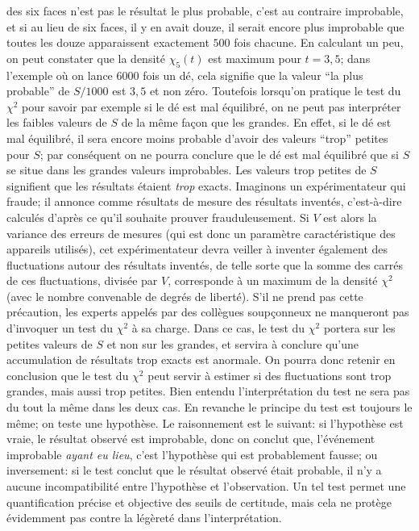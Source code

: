des six faces n'est pas le r\'esultat le plus probable, c'est au contraire
improbable, et si au lieu de six faces, il y en avait douze, il serait
encore plus improbable que toutes les douze apparaissent exactement
$500$ fois chacune. En calculant un peu, on peut constater que la
densit\'e $\chi_5 (t)$ est maximum pour $t = 3,5$; dans l'exemple o\`u 
on lance $6000$ fois un d\'e, cela signifie que la valeur ``la plus
probable'' de $S / 1000$ est $3,5$ et non z\'ero. 
\medskip
Toutefois lorsqu'on pratique le test du $\chi^2$ pour savoir par exemple 
si le d\'e est mal \'equilibr\'e, on ne peut pas interpr\'eter les faibles 
valeurs de $S$ de la m\^eme fa\c{c}on que les grandes. En effet, si le d\'e 
est mal \'equilibr\'e, il sera encore moins probable d'avoir des valeurs
``trop'' petites pour $S$; par cons\'equent on ne pourra conclure que le 
d\'e est mal \'equilibr\'e que si $S$ se situe dans les grandes valeurs
improbables. Les valeurs trop petites de $S$ signifient que les r\'esultats
\'etaient {\it trop} exacts. Imaginons un exp\'erimentateur qui fraude; il
annonce comme r\'esultats de mesure des r\'esultats invent\'es,
c'est-\`a-dire calcul\'es d'apr\`es ce qu'il souhaite prouver
frauduleusement. Si $V$ est alors la variance des erreurs de mesures (qui
est donc un param\`etre caract\'eristique des appareils utilis\'es), cet
exp\'erimentateur devra veiller \`a inventer \'egalement des fluctuations
autour des r\'esultats invent\'es, de telle sorte que la somme des carr\'es
de ces fluctuations, divis\'ee par $V$, corresponde \`a un maximum de la
densit\'e $\chi^2$ (avec le nombre convenable de degr\'es de libert\'e). S'il
ne prend pas cette pr\'ecaution, les experts appel\'es par des coll\`egues
soup\c{c}onneux ne manqueront pas d'invoquer un test du $\chi^2$ \`a sa
charge. Dans ce cas, le test du $\chi^2$ portera sur les petites valeurs de
$S$ et non sur les grandes, et servira \`a conclure qu'une accumulation
de r\'esultats trop exacts est anormale.
\medskip
On pourra donc retenir en conclusion que le test du $\chi^2$ peut servir
\`a estimer si des fluctuations sont trop grandes, mais aussi trop
petites. Bien entendu l'interpr\'etation du test ne sera pas du tout la 
m\^eme dans les deux cas. En revanche le principe du test est toujours 
le m\^eme;  on teste une hypoth\`ese. Le raisonnement est le suivant: si 
l'hypoth\`ese est vraie, le r\'esultat observ\'e est improbable, donc on
conclut que, l'\'ev\'enement improbable {\it ayant eu lieu}, c'est
l'hypoth\`ese qui est probablement fausse; ou inversement: si le test
conclut que le r\'esultat observ\'e \'etait probable, il n'y a aucune
incompatibilit\'e entre l'hypoth\`ese et l'observation. Un tel test permet
une quantification pr\'ecise et objective des seuils de certitude, mais 
cela ne prot\`ege \'evidemment pas contre la l\'eg\`eret\'e dans
l'interpr\'etation.


